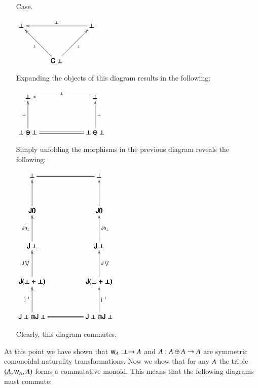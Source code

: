 \documentclass{lmcs}
\let\mto\to
\let\to\relax
\newcommand{\to}{\rightarrow}
\let\t\relax
\let\r\relax
\let\c\relax
\let\j\relax
\let\wn\relax
\let\H\relax
\newcommand{\func}[1]{\mathsf{#1}}
\newcommand{\H}[0]{\func{H}}
\newcommand{\J}[0]{\func{J}}
\newcommand{\h}[1]{\mathsf{h}_{#1}}
\newcommand{\t}[0]{\mathsf{t}}
\newcommand{\r}[1]{\mathsf{r}_{#1}}
\newcommand{\w}[1]{\mathsf{w}_{#1}}
\newcommand{\c}[1]{\mathsf{c}_{#1}}
\newcommand{\j}[1]{\mathsf{j}_{#1}}
\newcommand{\jinv}[1]{\mathsf{j}^{-1}_{#1}}
\newcommand{\wn}[0]{\mathop{?}}
\newcommand{\codiag}[1]{\bigtriangledown_{#1}}
\newenvironment{diagram}{
  \begin{center}
    \begin{math}
      \bfig
}{
      \efig
    \end{math}
  \end{center}
}
\begin{document}
\begin{itemize}
\begin{itemize}
  \item[Case.] \ \\
    \begin{diagram}
      \Vtriangle/<-`<-`<-/[
        \perp`
        \wn \perp`
        \func{C} \perp;
        \r{\perp}`
        \t{\perp}`
        \c{\perp}]
    \end{diagram}
    Expanding the objects of this diagram results in the following:
    \begin{diagram}
      \square/<-`<-`<-`=/<950,500>[
        \perp`
        \wn \perp`
        \wn \perp \oplus \wn \perp`
        \wn \perp \oplus \wn \perp;
        \r{\perp}`
        \t{\perp}`
        \c{\perp}`]          
    \end{diagram}
    Simply unfolding the morphisms in the previous diagram reveals the following:
    \begin{diagram}
      \square/`<-`<-`=/<950,500>[
        \J(\H\perp + \H\perp)`
        \J(\H\perp + \H\perp)`
        \J\H\perp \oplus \J\H\perp`
        \J\H\perp \oplus \J\H\perp;`
        \jinv{}`
        \jinv{}`]

      \square(0,500)/`<-`<-`/<950,500>[
        \J\H\perp`
        \J\H\perp`
        \J(\H\perp + \H\perp)`
        \J(\H\perp + \H\perp);
        `
        \J\codiag{}`
        \J\codiag{}`]

      \square(0,1000)/`<-`<-`/<950,500>[
        \J0`
        \J0`
        \J\H\perp`
        \J\H\perp;
        `
        \J\h{\perp}`
        \J\h{\perp}`]

      \square(0,1500)/=`<-`<-`/<950,500>[
        \perp`
        \perp`
        \J0`
        \J0;
        `
        \j{}`
        \j{}`]
    \end{diagram}
    Clearly, this diagram commutes.
  \end{itemize}
\end{itemize}
At this point we have shown that $\w{A} : \perp \mto \wn A$ and
$\c{A} : \wn A \oplus \wn A \mto \wn A$ are symmetric comonoidal
naturality transformations.  Now we show that for any $\wn A$ the
triple $(\wn A,\w{A},\c{A})$ forms a commutative monoid.  This means
that the following diagrams must commute:
\end{document}
